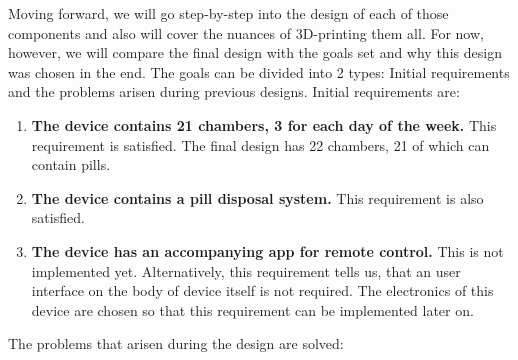 Moving forward, we will go step-by-step into the design of each of those components and also will cover the nuances of 3D-printing them all. For now, however, we will compare the final design with the goals set and why this design was chosen in the end. The goals can be divided into 2 types: Initial requirements and the problems arisen during previous designs. Initial requirements are:
\begin{enumerate}
	\item{\textbf{The device contains 21 chambers, 3 for each day of the week.}} This requirement is satisfied. The final design has 22 chambers, 21 of which can contain pills.
	\item{\textbf{The device contains a pill disposal system.}} This requirement is also satisfied. 
	\item{\textbf{The device has an accompanying app for remote control.}} This is not implemented yet. Alternatively, this requirement tells us, that an user interface on the body of device itself is not required. The electronics of this device are chosen so that this requirement can be implemented later on.
\end{enumerate}
The problems that arisen during the design are solved:
